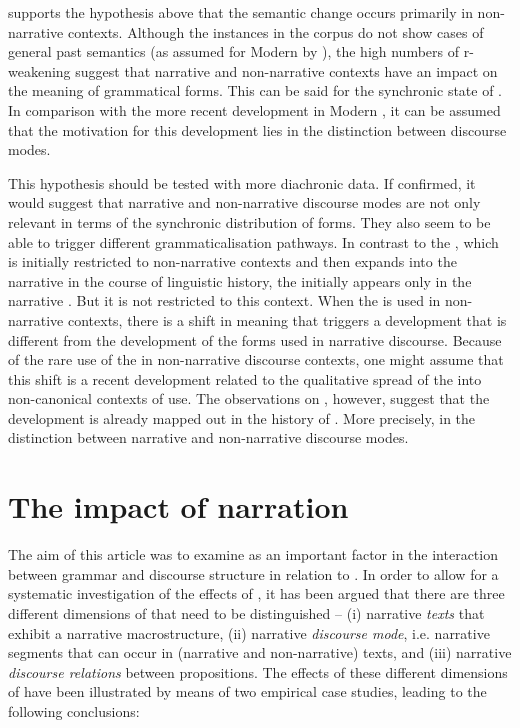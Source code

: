 \documentclass[output=paper,colorlinks,citecolor=brown]{langscibook}
\begin{document}
 supports the hypothesis above that the semantic change occurs primarily in non-narrative contexts. Although the instances in the  corpus do not show cases of general past semantics (as assumed for Modern  by \citealt{Hennig2000}), the high numbers of r-weakening suggest that narrative and non-narrative contexts have an impact on the meaning of grammatical forms. This can be said for the synchronic state of . In comparison with the more recent development in Modern , it can be assumed that the motivation for this development lies in the distinction between discourse modes. 

This hypothesis should be tested with more diachronic data. If confirmed, it would suggest that narrative and non-narrative discourse modes are not only relevant in terms of the synchronic distribution of  forms. They also seem to be able to trigger different grammaticalisation pathways. In contrast to the , which is initially restricted to non-narrative contexts and then expands into the narrative  in the course of linguistic history, the  initially appears only in the narrative . But it is not restricted to this context. When the  is used in non-narrative contexts, there is a shift in meaning that triggers a development that is different from the development of the  forms used in narrative discourse. Because of the rare use of the  in non-narrative discourse contexts, one might assume that this shift is a recent development related to the qualitative spread of the  into non-canonical contexts of use. The observations on , however, suggest that the development is already mapped out in the history of . More precisely, in the distinction between narrative and non-narrative discourse modes. 


\section{The impact of narration} \label{sec:zeman:4}
The aim of this article was to examine  as an important factor in the interaction between grammar and discourse structure in relation to . In order to allow for a systematic investigation of the effects of , it has been argued that there are three different dimensions of  that need to be distinguished – (i) narrative \textit{texts} that exhibit a narrative macrostructure, (ii) narrative \textit{discourse mode}, i.e. narrative segments that can occur in (narrative and non-narrative) texts, and (iii) narrative \textit{discourse relations} between propositions. The effects of these different dimensions of  have been illustrated by means of two empirical case studies, leading to the following conclusions:
\end{document}
